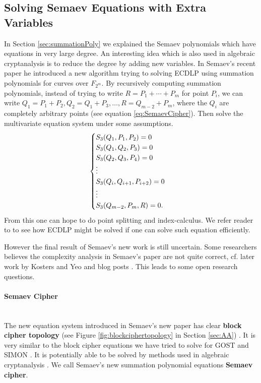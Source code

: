 \subsection{Solving Semaev Equations with Extra Variables} \label{sec:SemaevCipher}
In Section \ref{sec:summationPoly} we explained the Semaev polynomials which have equations in very large degree. An interesting idea which is also used in algebraic cryptanalysis is to reduce the degree by adding new variables.
In Semaev's recent paper \cite{cryptoeprint:2015:310} he introduced a new algorithm trying to solving ECDLP using summation polynomials for curves over $F_{2^m}$. By recursively computing summation polynomials, instead of trying to write $R=P_1+\cdots+P_m$ for point $P_i$, we can write $Q_1 = P_1+P_2, Q_2=Q_1+P_3, \dots , R = Q_{m-2}+P_m$, where the $Q_i$ are completely arbitrary points (see equation \ref{eq:SemaevCipher}). Then solve the multivariate equation system under some assumptions. 
\begin{equation}
\label{eq:SemaevCipher}
\begin{cases}
S_3(Q_1,P_1,P_2) = 0 \cr
S_3(Q_1,Q_2,P_3) = 0 \cr
S_3(Q_2,Q_3,P_4) = 0 \cr
\vdots \cr
S_3(Q_i,Q_{i+1},P_{i+2}) = 0 \cr
\vdots \cr
S_3(Q_{m-2},P_m,R) = 0.
\cr
\end{cases}
\end{equation}
From this one can hope to do point splitting and index-calculus. We refer reader to \cite{cryptoeprint:2016:704,petit2016algebraic} to see how ECDLP might be solved if one can solve such equation efficiently.

However the final result of Semaev's new work is still uncertain. Some researchers believes the complexity analysis in Semaev's paper are not quite correct, cf. later work by Kosters and Yeo \cite{kosters2015notes} and blog posts \cite{StevenECDLP2015,CourtoisECCPost2015}. This leads to some open research questions. 

\paragraph{Semaev Cipher} \mbox{} \\ 
The new equation system introduced in Semaev's new paper has clear \textbf{block cipher topology} (see Figure \ref{fig:blockciphertopology} in Section \ref{sec:AA}) \cite{courtois2002cryptanalysis}. It is very similar to the block cipher equations we have tried to solve for GOST and SIMON \cite{courtois2012contradiction,courtois2014combined}. It is potentially able to be solved by methods used in algebraic cryptanalysis \cite{courtois2002cryptanalysis}. We call Semaev's new summation polynomial equations \textbf{Semaev cipher}.

